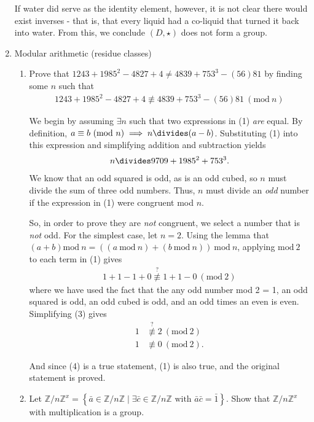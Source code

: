\documentclass{scrartcl}
\begin{document}
\begin{enumerate}
		If water did serve as the identity element, however, it is not clear there would exist inverses - that is, that every liquid had a co-liquid that turned it back into water. From this, we conclude $(D, \star)$ does not form a group.
	
	\item Modular arithmetic (residue classes)
	
	\begin{enumerate}
	
		\item Prove that $1243 + 1985^2 -4827 +4 \neq 4839 +753^3 -(56)81$ by finding some $n$ such that
		\begin{align}
			1243 + 1985^2 -4827 +4 \not\equiv 4839 +753^3 -(56)81 \ (\textrm{mod}\ n)
		\end{align}
		
		We begin by assuming $\exists n$ such that two expressions in (1) \textit{are} equal.
		By definition, $a \equiv b\ (\textrm{mod}\ n) \implies n \divides  (a-b)$. Substituting (1) into this expression and simplifying addition and subtraction yields
		\begin{align}
			n \divides 9709 + 1985^2 + 753^3.
		\end{align}
		We know that an odd squared is odd, as is an odd cubed, so $n$ must divide the sum of three odd numbers. Thus, $n$ must divide an \textit{odd} number if the expression in (1) were congruent mod $n$.
		
		So, in order to prove they are \textit{not} congruent, we select a number that is \textit{not} odd. For the simplest case, let $n=2$. Using the lemma that $(a+b)\textrm{mod}\ n =((	a\ \textrm{mod}\ n) + (b\ \textrm{mod}\ n))\ \textrm{mod}\ n$, applying $\textrm{mod}\ 2$ to each term in (1) gives
		\begin{align}
			1 + 1 - 1 + 0 \stackrel{?}{\not\equiv}  1 + 1 - 0\ (\textrm{mod}\ 2)
		\end{align}
		where we have used the fact that the any odd number mod 2 = 1, an odd squared is odd, an odd cubed is odd, and an odd times an even is even. Simplifying (3) gives
		\begin{align}
			1 &\stackrel{?}{\not\equiv} 2\ (\textrm{mod}\ 2) \nonumber \\
			1 &\not\equiv 0\ (\textrm{mod}\ 2).
		\end{align}
		
		And since (4) is a true statement, (1) is also true, and the original statement is proved.
		
		
		\item Let $\mathbb{Z} /n \mathbb{Z}^x = \left\{ \bar{a} \in \mathbb{Z} /n\mathbb{Z} \mid \exists \bar{c} \in \mathbb{Z} /n \mathbb{Z} \textrm{ with } \bar{a} \bar{c} = \bar{1} \right\}$. Show that $\mathbb{Z} /n \mathbb{Z}^x$ with multiplication is a group.
		

\end{enumerate}
\end{enumerate}
\end{document}
